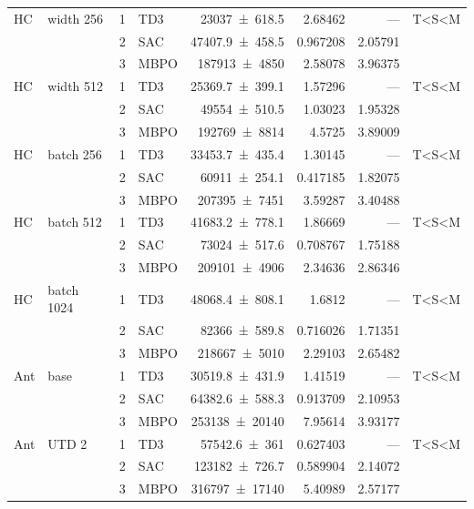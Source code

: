 {\begin{longtable}{@{}llrlrrrl@{}}
    HC & width 256 & \num{1} & TD3 & \num{23037+-618.5} & \num{2.68462} & --- & T<S<M \\
     &  & \num{2} & SAC & \num{47407.9+-458.5} & \num{0.967208} & \num{2.05791} &  \\
     &  & \num{3} & MBPO & \num{187913+-4850} & \num{2.58078} & \num{3.96375} &  \\
    HC & width 512 & \num{1} & TD3 & \num{25369.7+-399.1} & \num{1.57296} & --- & T<S<M \\
     &  & \num{2} & SAC & \num{49554+-510.5} & \num{1.03023} & \num{1.95328} &  \\
     &  & \num{3} & MBPO & \num{192769+-8814} & \num{4.5725} & \num{3.89009} &  \\
    HC & batch 256 & \num{1} & TD3 & \num{33453.7+-435.4} & \num{1.30145} & --- & T<S<M \\
     &  & \num{2} & SAC & \num{60911+-254.1} & \num{0.417185} & \num{1.82075} &  \\
     &  & \num{3} & MBPO & \num{207395+-7451} & \num{3.59287} & \num{3.40488} &  \\
    HC & batch 512 & \num{1} & TD3 & \num{41683.2+-778.1} & \num{1.86669} & --- & T<S<M \\
     &  & \num{2} & SAC & \num{73024+-517.6} & \num{0.708767} & \num{1.75188} &  \\
     &  & \num{3} & MBPO & \num{209101+-4906} & \num{2.34636} & \num{2.86346} &  \\
    HC & batch 1024 & \num{1} & TD3 & \num{48068.4+-808.1} & \num{1.6812} & --- & T<S<M \\
     &  & \num{2} & SAC & \num{82366+-589.8} & \num{0.716026} & \num{1.71351} &  \\
     &  & \num{3} & MBPO & \num{218667+-5010} & \num{2.29103} & \num{2.65482} &  \\
    \midrule
    Ant & base & \num{1} & TD3 & \num{30519.8+-431.9} & \num{1.41519} & --- & T<S<M \\
     &  & \num{2} & SAC & \num{64382.6+-588.3} & \num{0.913709} & \num{2.10953} &  \\
     &  & \num{3} & MBPO & \num{253138+-20140} & \num{7.95614} & \num{3.93177} &  \\
    Ant & UTD 2 & \num{1} & TD3 & \num{57542.6+-361} & \num{0.627403} & --- & T<S<M \\
     &  & \num{2} & SAC & \num{123182+-726.7} & \num{0.589904} & \num{2.14072} &  \\
     &  & \num{3} & MBPO & \num{316797+-17140} & \num{5.40989} & \num{2.57177} &  \\

\end{longtable}}
